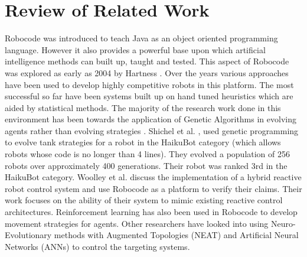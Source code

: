 \documentclass{article}
\theoremstyle{plain}
\theoremstyle{definition}
\theoremstyle{remark}
\begin{document}
 
\section{Review of Related Work}

Robocode was introduced to teach Java as an object oriented programming language. However it also provides a powerful base upon which artificial intelligence methods can built up, taught and tested. This aspect of Robocode was explored as early as 2004 by Hartness \cite{Hartness}. Over the years various approaches have been used to develop highly competitive robots in this platform. The most successful so far have been systems built up on hand tuned heuristics which are aided by statistical methods. The majority of the research work done in this environment has been towards the application of Genetic Algorithms in evolving agents rather than evolving strategies \cite{strategies, gp1, gp2}.  Shichel et al. \cite{gp1}, used genetic programming to evolve tank strategies for a robot in the HaikuBot category (which allows robots whose code is no longer than 4 lines). They evolved a population of 256 robots over approximately 400 generations. Their robot was ranked 3rd in the HaikuBot category. Woolley et al. \cite{woolley} discuss the implementation of a hybrid reactive robot control system and use Robocode as a platform to verify their claims. Their work focuses on the ability of their system to mimic existing reactive control architectures. Reinforcement learning has also been used in Robocode to develop movement strategies for agents\cite{gade}. Other researchers have looked into using Neuro-Evolutionary methods with Augmented Topologies (NEAT) and Artificial Neural Networks (ANNs) \cite{nielsenAI} to control the targeting systems.
\end{document}
